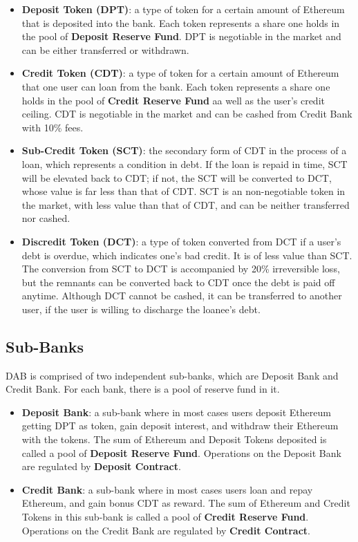 \documentclass[review]{elsarticle}
\begin{document}
\begin{itemize} 
   \item \textbf{Deposit Token (DPT)}: a type of token for a certain amount of Ethereum that is deposited into the bank. Each token represents a share one holds in the pool of \textbf{Deposit Reserve Fund}. DPT is negotiable in the market and can be either transferred or withdrawn.
   \item \textbf{Credit Token (CDT)}: a type of token for a certain amount of Ethereum that one user can loan from the bank. Each token represents a share one holds in the pool of \textbf{Credit Reserve Fund} aa well as the user's credit ceiling. CDT is negotiable in the market and can be cashed from Credit Bank with 10\% fees.
   \item \textbf{Sub-Credit Token (SCT)}: the secondary form of CDT in the process of a loan, which represents a condition in debt. If the loan is repaid in time, SCT will be elevated back to CDT; if not, the SCT will be converted to DCT, whose value is far less than that of CDT. SCT is an non-negotiable token in the market, with less value than that of CDT, and can be neither transferred nor cashed.
   \item \textbf{Discredit Token (DCT)}: a type of token converted from DCT if a user's debt is overdue, which indicates one's bad credit. It is of less value than SCT. The conversion from SCT to DCT is accompanied by 20\% irreversible loss, but the remnants can be converted back to CDT once the debt is paid off anytime. Although DCT cannot be cashed, it can be transferred to another user, if the user is willing to discharge the loanee's debt.
\end{itemize}

\subsection{Sub-Banks}
DAB is comprised of two independent sub-banks, which are Deposit Bank and Credit Bank. For each bank, there is a pool of reserve fund in it.
\begin{itemize} 
   \item \textbf{Deposit Bank}: a sub-bank where in most cases users deposit Ethereum getting DPT as token, gain deposit interest, and withdraw their Ethereum with the tokens. The sum of Ethereum and Deposit Tokens deposited is called a pool of \textbf{Deposit Reserve Fund}. Operations on the Deposit Bank are regulated by \textbf{Deposit Contract}.
   \item \textbf{Credit Bank}: a sub-bank where in most cases users loan and repay Ethereum, and gain bonus CDT as reward. The sum of Ethereum and Credit Tokens in this sub-bank is called a pool of \textbf{Credit Reserve Fund}. Operations on the Credit Bank are regulated by \textbf{Credit Contract}.
\end{itemize}
\end{document}
